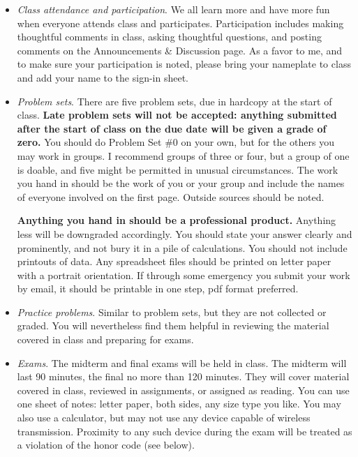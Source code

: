 \documentclass[12pt]{article}
\begin{document}
\begin{itemize}

\item \textit{Class attendance and participation}.
We all learn more and have more fun when everyone attends class and participates.
Participation includes making thoughtful comments in class,
asking thoughtful questions,
and posting comments on the Announcements \& Discussion page.
As a favor to me, and to make sure your participation is noted,
please bring your nameplate to class and add your name to the
sign-in sheet.

\item \textit{Problem sets}.
There are five problem sets,
due in hardcopy at the start of class.
{\bf Late problem sets will not be accepted:
anything submitted after the start of class on the due date will be given a grade of zero.}
You should do Problem Set \#0 on your own,
but for the others you may work in groups.
I recommend groups of three or four,
but a group of one is doable, and five might be permitted in unusual circumstances.
The work you hand in should be the work of you or your group
and include the names of everyone involved on the first page.
Outside sources should be noted.

{\bf Anything you hand in should be a  professional product.}
Anything less will be downgraded accordingly.
You should state your answer clearly and prominently,
and not bury it in a pile of calculations.
You should not include printouts of data.
Any spreadsheet files should be printed on letter paper
with a portrait orientation.
If through some emergency you submit your work by email,
it should be printable in one step,
pdf format preferred.

\item \textit{Practice problems}.
Similar to problem sets, but they are not collected or graded.
You will nevertheless find them helpful in reviewing the
material covered in class and preparing for exams.


\item \textit{Exams}.
The midterm and final exams will be held in class.
The midterm will last 90 minutes, the final no more than 120 minutes.
They will cover material covered in class, reviewed in assignments,
or assigned as reading.
You can use one sheet of notes: letter paper, both sides, any size type you like.
You may also use a calculator, but may not use any device
capable of wireless transmission.  Proximity to any such
device during the exam will be treated as a violation of the honor
code (see below).


\end{itemize}
\end{document}
